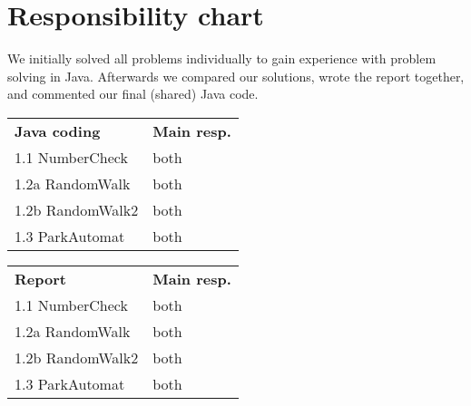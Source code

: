 \section*{Responsibility chart}

We initially solved all problems individually to gain experience with problem solving in Java. Afterwards we compared our solutions, wrote the report together, and commented our final (shared) Java code.

\begin{multicols}{2}

\begin{table}[H]
    \begin{tabular}{ll}
    \textbf{Java coding}      & \textbf{Main resp.} \\
    1.1 NumberCheck  & both       \\
    1.2a RandomWalk  & both       \\
    1.2b RandomWalk2 & both       \\
    1.3 ParkAutomat  & both       \\
    \end{tabular}
\end{table}

\begin{table}[H]
    \begin{tabular}{ll}
    \textbf{Report}      & \textbf{Main resp.} \\
    1.1 NumberCheck  & both       \\
    1.2a RandomWalk  & both       \\
    1.2b RandomWalk2 & both       \\
    1.3 ParkAutomat  & both       \\
    \end{tabular}
\end{table}

\end{multicols}
